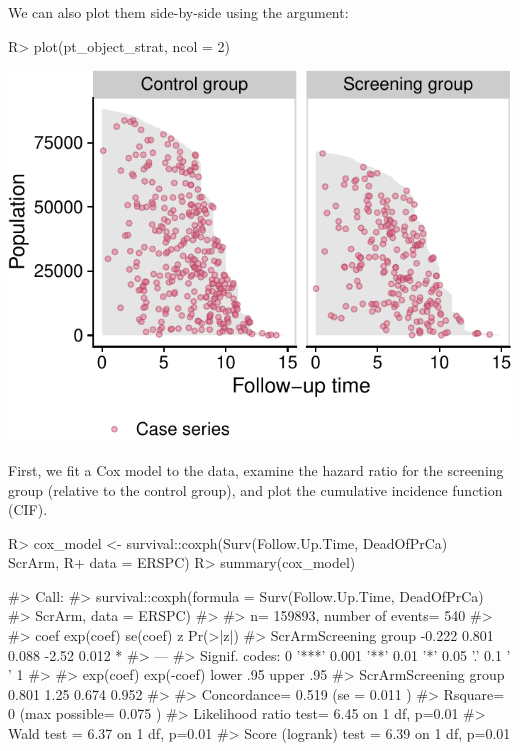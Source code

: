 \documentclass[
]{jss}
\begin{document}
We can also plot them side-by-side using the  argument:

\begin{CodeChunk}

\begin{CodeInput}
R> plot(pt_object_strat, ncol = 2)
\end{CodeInput}


\begin{center}\includegraphics{../figures/plot-stratified-erspc-data-side-1} \end{center}

\end{CodeChunk}

First, we fit a Cox model to the data, examine the hazard ratio for the
screening group (relative to the control group), and plot the cumulative
incidence function (CIF).

\begin{CodeChunk}

\begin{CodeInput}
R> cox_model <- survival::coxph(Surv(Follow.Up.Time, DeadOfPrCa) ~ ScrArm, 
R+                              data = ERSPC)
R> summary(cox_model)
\end{CodeInput}

\begin{CodeOutput}
#> Call:
#> survival::coxph(formula = Surv(Follow.Up.Time, DeadOfPrCa) ~ 
#>     ScrArm, data = ERSPC)
#> 
#>   n= 159893, number of events= 540 
#> 
#>                         coef exp(coef) se(coef)     z Pr(>|z|)  
#> ScrArmScreening group -0.222     0.801    0.088 -2.52    0.012 *
#> ---
#> Signif. codes:  0 '***' 0.001 '**' 0.01 '*' 0.05 '.' 0.1 ' ' 1
#> 
#>                       exp(coef) exp(-coef) lower .95 upper .95
#> ScrArmScreening group     0.801       1.25     0.674     0.952
#> 
#> Concordance= 0.519  (se = 0.011 )
#> Rsquare= 0   (max possible= 0.075 )
#> Likelihood ratio test= 6.45  on 1 df,   p=0.01
#> Wald test            = 6.37  on 1 df,   p=0.01
#> Score (logrank) test = 6.39  on 1 df,   p=0.01
\end{CodeOutput}
\end{CodeChunk}
\end{document}
